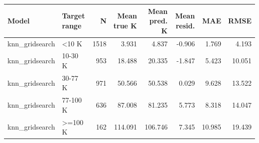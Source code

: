 \begin{tabular}{llrrrrrr}
\toprule
Model & Target range & N & Mean true K & Mean pred. K & Mean resid. & MAE & RMSE \\
\midrule
knn\_gridsearch & <10 K & 1518 & 3.931 & 4.837 & -0.906 & 1.769 & 4.193 \\
knn\_gridsearch & 10-30 K & 953 & 18.488 & 20.335 & -1.847 & 5.423 & 10.051 \\
knn\_gridsearch & 30-77 K & 971 & 50.566 & 50.538 & 0.029 & 9.628 & 13.522 \\
knn\_gridsearch & 77-100 K & 636 & 87.008 & 81.235 & 5.773 & 8.318 & 14.047 \\
knn\_gridsearch & >=100 K & 162 & 114.091 & 106.746 & 7.345 & 10.985 & 19.439 \\
\bottomrule
\end{tabular}
